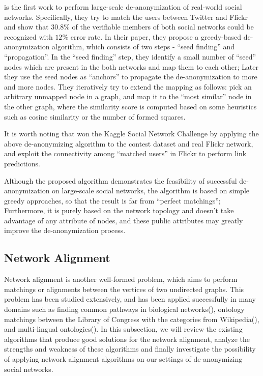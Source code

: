 \documentclass[11pt,letterpaper]{article}
\begin{document}
\cite{Narayanan2009} is the first work to perform large-scale de-anonymization of real-world social networks. Specifically, they try to match the users between Twitter and Flickr and show that $30.8\%$ of the verifiable members of both social networks could be recognized with $12\%$ error rate. In their paper, they propose a greedy-based de-anonymization algorithm, which consists of two steps - ``seed finding'' and ``propagation''. In the ``seed finding'' step, they identify a small number of ``seed'' nodes which are present in the both networks and map them to each other; Later they use the seed nodes as ``anchors'' to propagate the de-anonymization to more and more nodes. They iteratively try to extend the mapping as follows: pick an arbitrary unmapped node in a graph, and map it to the ``most similar'' node in the other graph, where the similarity score is computed based on some heuristics such as cosine similarity or the number of formed squares.

It is worth noting that \cite{Narayanan2011} won the Kaggle Social Network Challenge by applying the above de-anonymizing algorithm to the contest dataset and real Flickr network, and exploit the connectivity among ``matched users'' in Flickr to perform link predictions. 

Although the proposed algorithm demonstrates the feasibility of successful de-anonymization on large-scale social networks, the algorithm is based on simple greedy approaches, so that the result is far from ``perfect matchings''; Furthermore, it is purely based on the network topology and doesn't take advantage of any attribute of nodes, and these public attributes may greatly improve the de-anonymization process.

\subsection{Network Alignment}
Network alignment is another well-formed problem, which aims to perform matchings or alignments between the vertices of two undirected graphs. This problem has been studied extensively, and has been applied successfully in many domains such as finding common pathways in biological networks(\cite{Singh2007, Singh2008, Liao2009}), ontology matchings between the Library of Congress with the categories from Wikipedia(\cite{Bayati2009}), and multi-lingual ontologies(\cite{Kreitmann2011, Bayati2009a}). In this subsection, we will review the existing algorithms that produce good solutions for the network alignment, analyze the strengths and weakness of these algorithms and finally investigate the possibility of applying network alignment algorithms on our settings of de-anonymizing social networks.
 
\end{document}
